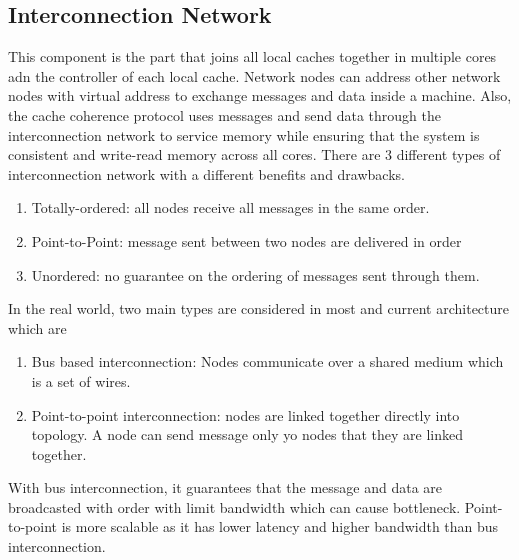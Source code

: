 \subsection{Interconnection Network}
This component is the part that joins all local caches together in multiple cores adn the controller of each local cache. Network nodes can address other network nodes with virtual address to exchange messages and data inside a machine.
Also, the cache coherence protocol uses messages and send data through the interconnection network to service memory while ensuring that the system is consistent and write-read memory across all cores.
There are 3 different types of interconnection network with a different benefits and drawbacks.
\begin{enumerate}
        \item Totally-ordered: all nodes receive all messages in the same order.
        \item Point-to-Point: message sent between two nodes are delivered in order
        \item Unordered: no guarantee on the ordering of messages sent through them.
\end{enumerate}
In the real world, two main types are considered in most and current architecture which are
\begin{enumerate}
        \item Bus based interconnection: Nodes communicate over a shared medium which is a set of wires.
        \item Point-to-point interconnection: nodes are linked together directly into topology. A node can send message
                only yo nodes that they are linked together.
\end{enumerate}
With bus interconnection, it guarantees that the message and data are broadcasted with order with limit bandwidth which can cause bottleneck.
Point-to-point is more scalable as it has lower latency and higher bandwidth than bus interconnection.

